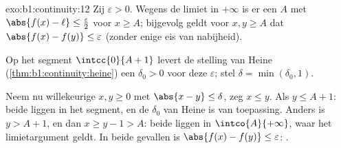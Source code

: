 \begin{solution}{exo:b1:continuity:12}
Zij $\varepsilon > 0$. Wegens de limiet in $+\infty$ is er een $A$
met $\abs{f(x) - \ell} \leq \frac\varepsilon2$ voor $x \geq A$;
bijgevolg geldt voor $x, y \geq A$ dat $\abs{f(x) - f(y)} \leq
\varepsilon$ (zonder enige eis van nabijheid).

Op het segment $\intcc{0}{A + 1}$ levert de stelling van Heine
(\cref{thm:b1:continuity:heine}) een $\delta_0 > 0$ voor deze
$\varepsilon$; stel $\delta = \min(\delta_0, 1)$.

Neem nu willekeurige $x, y \geq 0$ met $\abs{x - y} \leq \delta$,
zeg $x \leq y$. Als $y \leq A + 1$: beide liggen in het segment, en
de $\delta_0$ van Heine is van toepassing. Anders is $y > A + 1$, en
dan $x \geq y - 1 > A$: beide liggen in $\intco{A}{+\infty}$, waar
het limietargument geldt. In beide gevallen is $\abs{f(x) - f(y)}
\leq \varepsilon$: .
\end{solution}

